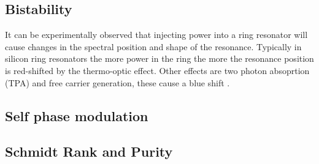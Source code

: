 \subsection{Bistability}
It can be experimentally observed that injecting power into a ring resonator will cause changes in the spectral position and shape of the resonance. Typically in silicon ring resonators the more power in the ring the more the resonance position is red-shifted by the thermo-optic effect\cite{almeida_optical_2004-1}. Other effects are two photon absoprtion (TPA) and free carrier generation, these cause a blue shift \cite{xu_carrier-induced_2006}.
\subsection{Self phase modulation}
\subsection{Schmidt Rank and Purity}
